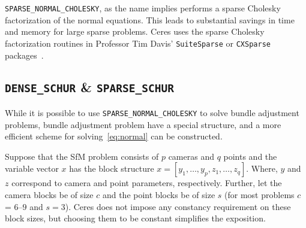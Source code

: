 \texttt{SPARSE\_NORMAL\_CHOLESKY}, as the name implies performs a
sparse Cholesky factorization of the normal equations. This leads to
substantial savings in time and memory for large sparse
problems. Ceres uses the sparse Cholesky factorization routines in  Professor Tim Davis'  \texttt{SuiteSparse} or
\texttt{CXSparse} packages~\cite{chen2006acs}.

\subsection{\texttt{DENSE\_SCHUR} \& \texttt{SPARSE\_SCHUR}}
While it is possible to use \texttt{SPARSE\_NORMAL\_CHOLESKY} to solve bundle adjustment problems, bundle adjustment problem have a special structure, and a more efficient scheme for solving~\eqref{eq:normal} can be constructed.

Suppose that the SfM problem consists of $p$ cameras and $q$ points and the variable vector $x$ has the  block structure $x = [y_{1},\hdots,y_{p},z_{1},\hdots,z_{q}]$. Where, $y$ and $z$ correspond to camera and point parameters, respectively.  Further, let the camera blocks be of size $c$ and the point blocks be of size $s$ (for most problems $c$ =  $6$--$9$ and $s = 3$). Ceres does not impose any constancy requirement on these block sizes, but choosing them to be constant simplifies the exposition.

